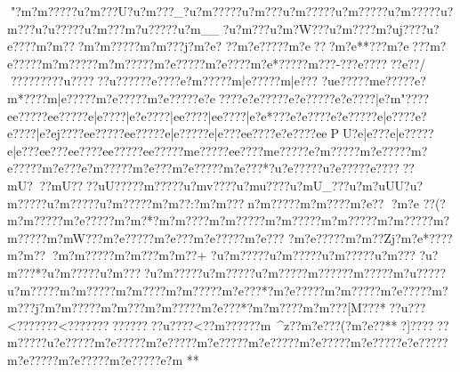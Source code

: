 {{{{{{{{{{{{{{{{{{{{{{{{{{{{{{{{{{{{{{{{{{{{{{{{{{{{{{{{{{{{{{{{{{{{{{{{{{{{{{{{{{{{{{{{{{{{{{{{{{{{{{{{{{{{{{{{{{{{{{{{{{{{{{{{{{{{{{{{{{{{{{{{{{{{{{{{{{{{{{{{{{{{{{{{{{{{{{{{{{{{{{{{{{{{{{{{{{{{{{{{{{{{{{{{{{{{{{{{{{{{{{{{{{{{{{{{{{{{{{{{{{{{{{{{{{{{{{{{{{{{{{{{{{{{{{{{{{{{{{{{{{{{{{{{{{{{{{{{{{{{{{{{{{{{{{{{{{{{{{{{{{{{{{{{{{{{{{{{{{{{{{{{{{{{{{{{{{{{{{{{{{{{{{{{{{{{{{{{{{{{{{{{{{{{{{{{{{{{{{{{{{{{{{{{{{{{{{{{{{{{{{{{{{{{{{{{{{{{{{{{{{{{{{{{{{{{{{{{{{{{{{{{{{{{{{{{{{{{{{{{{{{{{{{{{{{{{{{{{{{{{{{{{{{{{{{{{{{{{{{{{{{{{{{{{{{{{{{{{{{{{{{{{{{{{{{{{{{{{{{{{{{{{{{{{{{{{{{{{{{{{{{{{{{{{{{{{{{{{{{{{{{{{{{{{{{{{{{{{{{{{{{{{{{{{{{{{{{{{{{{{{{{{{{{{{{{{{{{{{{{{{{{{{{{{{{{{{{{{{{{{{{{{{{{{{{{{{{{{{{{{{{{{{{{{{{{{{{{{{{{{{{{{{{{{{{{{{{{{{{{{{{{{{{{{{{{{{{{{{{{{{{{{{{{{{{{{{{{{{{{{{{{{{{{{{{{{{{{{{{{{{{{{{{{{{{{{{{{{{{{{{{{{{{{{{{{{{{{{{{{{{{{{{{{{{{{{{{{{{{{{{{{{{{{{{{{{{{{{{{{{{{{{{{{{{{{{{{{{{{{{{{{{"?m?m?????u?m???U?u?m???_?u?m?????u?m???u?m?????u?m?????u?m?????u?m???u?u?????u?m???m?u?????u?m__?u?m???u?m?W???u?m????m?uj????u?e????m?m?? ?m?m?????m?m???j?m?e?
? ?m?e?????m?e???m?e**???m?e?? ?m?e?????m?m?????m?m?????m?e?????m?e????m?e*????}?m???-???e??????e??/
??}???????u??????u?????}?e????e?m?????m|e?????m|e???
?u{e?????m{e?????e?m*????m|e?????m?e?????m?e?????e?e????e?e?????e?e?????e?e????|e?m"????e{e?????e{e?????e|e????|e?e????|e{e????|e{e????|e?e*???{e?e????{e?e?????e|e????{e?e????|e?ej????e{e?????e{e?????e|e?????e|e???e{e????{e?e????{e{ePU?e|e???e|e?????e|e???e{e???e{e????e{e?????e{e?????m{e?????e{e????m{e?????e?m?????m?e?????m?e?????m?e???e?m?????m?e???m?e?????m?e???*?u?e?????u?e????}?e??????mU???mU?? ??uU????}?m?????u?mv????u?mu????u?mU_???u?m?uUU?u?m?????u?m?????u?m?????m?m??: ?m?m???n?m?????m?m??? ?m?e?? ?m?e ??(?m?m?????m?e?????m?m?*?m?m????m?m?????m?m?????m?m?????m?m?????m?m?????m?mW}???m?e?????m?e???m?e?????m?e???
?m?e?????m?m??Zj?m?e*????m?m???m?m?????m?m???m?m??+
?u?m?????u?m?????u?m?????u?m??? ?u?m???*?u?m?????u?m????u?m?????u?m?????u?m????}?m?????}?m?????m?u?????u?m?????m?m?????m?m????m?m?????m?e???*?m?e?????m?m?????m?e?????m?m???j?m?m?????m?m???m?m?????m?e???*?m?m????m?m???}[M???*??u???<???????<?????????}??????u????<??m?????}?m~^z??m?e???(?m?e??**?{]??????m?????u?e?????m?e?????m?e?????m?e?????m?e?????m?e?????m?e?????e?e?????m?e?????m?e?????m?e?????e?m
**
}}}}}}}}}}}}}}}}}}}}}}}}}}}}}}}}}}}}}}}}}}}}}}}}}}}}}}}}}}}}}}}}}}}}}}}}}}}}}}}}}}}}}}}}}}}}}}}}}}}}}}}}}}}}}}}}}}}}}}}}}}}}}}}}}}}}}}}}}}}}}}}}}}}}}}}}}}}}}}}}}}}}}}}}}}}}}}}}}}}}}}}}}}}}}}}}}}}}}}}}}}}}}}}}}}}}}}}}}}}}}}}}}}}}}}}}}}}}}}}}}}}}}}}}}}}}}}}}}}}}}}}}}}}}}}}}}}}}}}}}}}}}}}}}}}}}}}}}}}}}}}}}}}}}}}}}}}}}}}}}}}}}}}}}}}}}}}}}}}}}}}}}}}}}}}}}}}}}}}}}}}}}}}}}}}}}}}}}}}}}}}}}}}}}}}}}}}}}}}}}}}}}}}}}}}}}}}}}}}}}}}}}}}}}}}}}}}}}}}}}}}}}}}}}}}}}}}}}}}}}}}}}}}}}}}}}}}}}}}}}}}}}}}}}}}}}}}}}}}}}}}}}}}}}}}}}}}}}}}}}}}}}}}}}}}}}}}}}}}}}}}}}}}}}}}}}}}}}}}}}}}}}}}}}}}}}}}}}}}}}}}}}}}}}}}}}}}}}}}}}}}}}}}}}}}}}}}}}}}}}}}}}}}}}}}}}}}}}}}}}}}}}}}}}}}}}}}}}}}}}}}}}}}}}}}}}}}}}}}}}}}}}}}}}}}}}}}}}}}}}}}}}}}}}}}}}}}}}}}}}}}}}}}}}}}}}}}}}}}}}}}}}}}}}}}}}}}}}}}}}}}}}}}}}}}}}}}}}}}}}}}}}}}}}}}}}}}}}}}}}}}}}}}}}}}}}}}}}}}}}}}}}}}}}}}}}}}}}}}}}}}}}}}}}}}}}}}}}}}}}}}}}}}}}}}}}}}}}}}}}}}}}}}}}}}}}}}}}}}}}}}}}}}}}}}}}}}}}}
